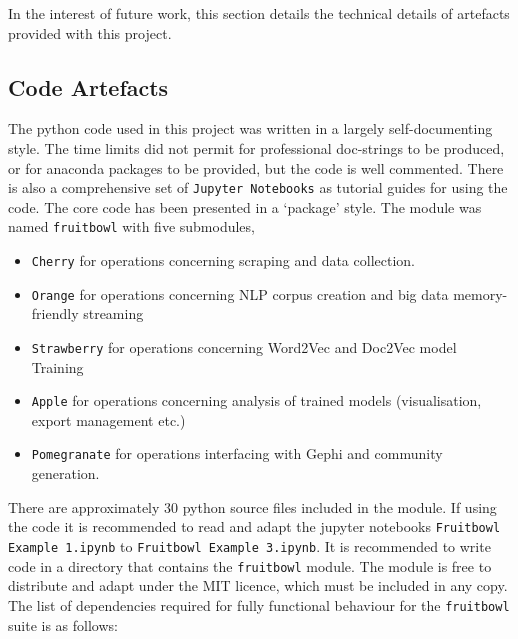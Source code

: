 In the interest of future work, this section details the technical details of artefacts provided with this project.

\subsection{Code Artefacts}
The python code used in this project was written in a largely self-documenting style. The time limits did not permit for professional doc-strings to be produced, or for anaconda packages to be provided, but the code is well commented. There is also a comprehensive set of \texttt{Jupyter Notebooks} as tutorial guides for using the code\cite{jupyter}. The core code has been presented in a `package' style.  The module was named \texttt{fruitbowl} with five submodules,
\begin{itemize}
\itemsep-.6em
\item \texttt{Cherry} for operations concerning scraping and data collection.
\item \texttt{Orange} for operations concerning NLP corpus creation and big data memory-friendly streaming
\item \texttt{Strawberry} for operations concerning Word2Vec and Doc2Vec model Training
\item \texttt{Apple} for operations concerning analysis of trained models (visualisation, export management etc.)
\item \texttt{Pomegranate} for operations interfacing with Gephi and community generation.
\end{itemize} 
There are approximately 30 python source files included in the module. If using the code it is recommended to read and adapt the jupyter notebooks \texttt{Fruitbowl Example 1.ipynb} to \texttt{Fruitbowl Example 3.ipynb}. It is recommended to write code in a directory that contains the \texttt{fruitbowl} module. The module is free to distribute and adapt under the MIT licence, which must be included in any copy.  The list of dependencies required for fully functional behaviour for the \texttt{fruitbowl} suite is as follows:
